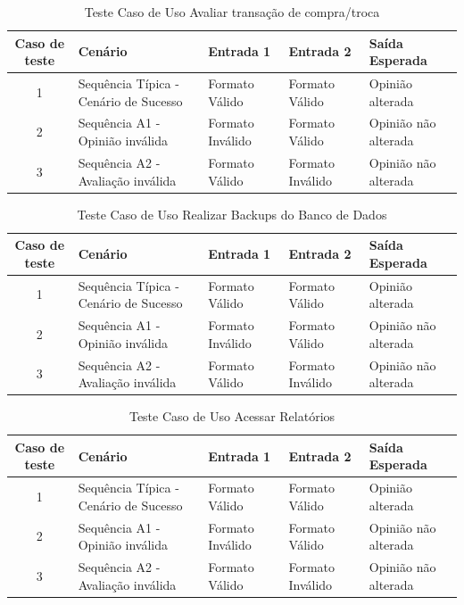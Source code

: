 \documentclass[a4paper,11pt]{article}
\begin{document}
	\begin{center}
	\begin{table}[H]
		\begin{tabularx}{\textwidth}{c|X|X|X|X}
			\textbf{Caso de teste} & \textbf{Cenário} & \textbf{Entrada 1} & \textbf{Entrada 2} & \textbf{Saída Esperada} \\
			\hline
			1 & Sequência Típica - Cenário de Sucesso & Formato Válido & Formato Válido & Opinião alterada\\ \hline
			2 & Sequência A1 - Opinião inválida & Formato Inválido & Formato Válido & Opinião não alterada\\ \hline
			3 & Sequência A2 - Avaliação inválida & Formato Válido & Formato Inválido & Opinião não alterada\\ \hline
			
		\end{tabularx}
		\caption{Teste Caso de Uso Avaliar transação de compra/troca}
	\end{table}
	\end{center}
	
	\begin{center}
	\begin{table}[H]
		\begin{tabularx}{\textwidth}{c|X|X|X|X}
			\textbf{Caso de teste} & \textbf{Cenário} & \textbf{Entrada 1} & \textbf{Entrada 2} & \textbf{Saída Esperada} \\
			\hline
			1 & Sequência Típica - Cenário de Sucesso & Formato Válido & Formato Válido & Opinião alterada\\ \hline
			2 & Sequência A1 - Opinião inválida & Formato Inválido & Formato Válido & Opinião não alterada\\ \hline
			3 & Sequência A2 - Avaliação inválida & Formato Válido & Formato Inválido & Opinião não alterada\\ \hline
			
		\end{tabularx}
		\caption{Teste Caso de Uso Realizar Backups do Banco de Dados}
	\end{table}
	\end{center}
	
	\begin{center}
	\begin{table}[H]
		\begin{tabularx}{\textwidth}{c|X|X|X|X}
			\textbf{Caso de teste} & \textbf{Cenário} & \textbf{Entrada 1} & \textbf{Entrada 2} & \textbf{Saída Esperada} \\
			\hline
			1 & Sequência Típica - Cenário de Sucesso & Formato Válido & Formato Válido & Opinião alterada\\ \hline
			2 & Sequência A1 - Opinião inválida & Formato Inválido & Formato Válido & Opinião não alterada\\ \hline
			3 & Sequência A2 - Avaliação inválida & Formato Válido & Formato Inválido & Opinião não alterada\\ \hline
			
		\end{tabularx}
		\caption{Teste Caso de Uso Acessar Relatórios}
	\end{table}
	\end{center}
	
\end{document}
